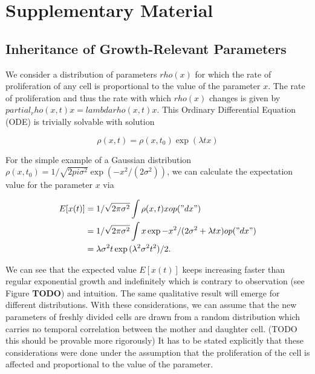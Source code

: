 \documentclass{article}
\begin{document}



\renewcommand{\thesection}{}
\renewcommand{\thesubsection}{S\arabic{subsection}}

\section{Supplementary Material}
\subsection{Inheritance of Growth-Relevant Parameters}

We consider a distribution of parameters $rho(x)$ for
which the rate of proliferation of any cell is proportional to the value of the parameter $x$.
The rate of proliferation and thus the rate with which $rho(x)$ changes is given by
$partial_rho(x,t) x = lambda rho(x,t) x$.
This Ordinary Differential Equation (ODE) is trivially solvable with solution

\begin{equation}
    \rho(x,t) = \rho(x,t_0) \exp(\lambda t x)
\end{equation}

For the simple example of a Gaussian distribution
$\rho(x,t_0) = 1/\sqrt{2 pi \sigma^2} \exp(-x^2/(2 \sigma^2))$, we can calculate the expectation
value for the parameter $x$ via

\begin{align}
    E[x(t)]
    &= 1/\sqrt{2 \pi \sigma^2} \int \rho(x,t) x op("dx")\\
    &= 1/\sqrt{2 \pi \sigma^2} \int x \exp{-x^2/(2 \sigma^2} + \lambda t x) op("dx")\\
    &= \lambda \sigma^2 t \exp{(\lambda^2 \sigma^2 t^2)/2}.
\end{align}

We can see that the expected value $E[x(t)]$ keeps increasing faster than regular exponential growth
and indefinitely which is contrary to observation (see Figure \textbf{TODO}) and intuition.
The same qualitative result will emerge for different distributions.
With these considerations, we can assume that the new parameters of freshly divided cells are drawn
from a random distribution which carries no temporal correlation between the mother and daughter
cell. (TODO this should be provable more rigorously)
It has to be stated explicitly that these considerations were done under the assumption that the
proliferation of the cell is affected and proportional to the value of the parameter.
\end{document}

